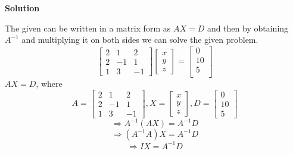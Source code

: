 \documentclass[a4paper, 12pt]{report}
\begin{document}
{      \begin{center}
      	\textbf{Solution}
      \end{center}
      The given can be written in a matrix form as $AX=D$ and then by obtaining $A^{-1}$ and multiplying it on both sides we can solve the given problem.
      \begin{equation*}
      \begin{bmatrix}
      2&1&2\\
      2&-1&1\\
      1&3&-1
      \end{bmatrix}
      \begin{bmatrix}
      x\\
      y\\
      z
      \end{bmatrix}
      =
      \begin{bmatrix}
      0\\
      10\\
      5\\
      \end{bmatrix}
      \end{equation*}
      $AX= D$, where 
      \begin{equation*}A=
      \begin{bmatrix}
      2&1&2\\
      2&-1&1\\
      1&3&-1
      \end{bmatrix}
      ,X=
      \begin{bmatrix}
      x\\
      y\\
      z
      \end{bmatrix}
      ,D=
      \begin{bmatrix}
      0\\
      10\\
      5
      \end{bmatrix}
      \end{equation*}
      \begin{equation*}
      \Rightarrow A^{-1}(AX)= A^{-1}D
      \end{equation*}
      \begin{equation*} 
      \Rightarrow (A^{-1}A)X= A^{-1}D 
      \end{equation*}
      \begin{equation*}
      \Rightarrow IX=A^{-1}D 
      \end{equation*}
      \begin{equation}

\end{equation}}
\end{document}
